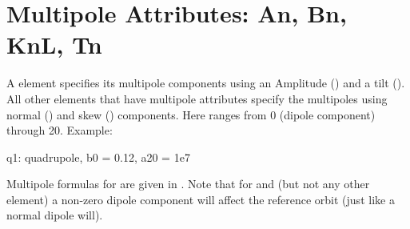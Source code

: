 \section{Multipole Attributes: An, Bn, KnL, Tn}
\label{s:multip}

A  element specifies its multipole components using an
Amplitude () and a tilt (). All other elements that
have multipole attributes specify the multipoles using normal
() and skew () components. Here  ranges from 0
(dipole component) through 20. Example:
\begin{example}
  q1: quadrupole, b0 = 0.12, a20 = 1e7
\end{example}

Multipole formulas for are given in .  Note that for
 and  (but not any other element) a
non-zero dipole component will affect the reference orbit (just like a
normal dipole will).
